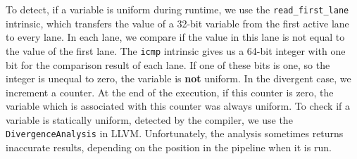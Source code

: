 To detect, if a variable is uniform during runtime, we use the \texttt{read\_first\_lane} intrinsic, which transfers the value of a 32-bit variable from the first active lane to every lane.
In each lane, we compare if the value in this lane is not equal to the value of the first lane.
The \texttt{icmp} intrinsic gives us a 64-bit integer with one bit for the comparison result of each lane.
If one of these bits is one, so the integer is unequal to zero, the variable is \textbf{not} uniform.
In the divergent case, we increment a counter.
At the end of the execution, if this counter is zero, the variable which is associated with this counter was always uniform.
To check if a variable is statically uniform, detected by the compiler, we use the \texttt{DivergenceAnalysis} in LLVM.
Unfortunately, the analysis sometimes returns inaccurate results, depending on the position in the pipeline when it is run.
